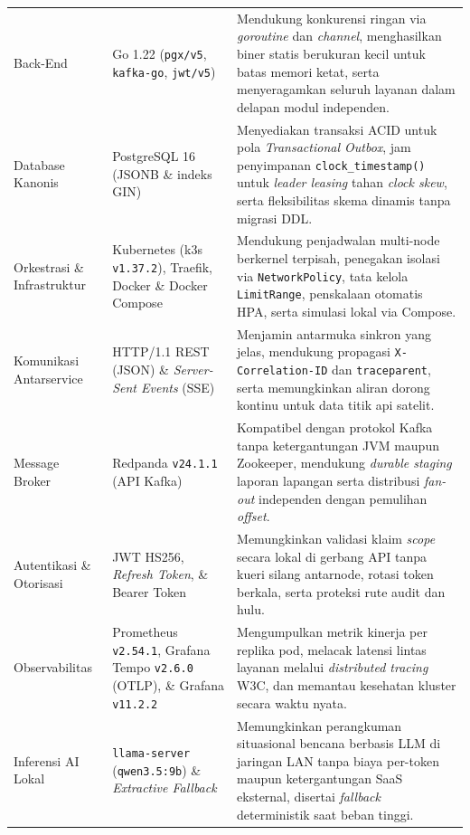 \begin{footnotesize}
\begin{spacing}{1.05}
\begin{xltabular}{\textwidth}{p{3.2cm} p{4.3cm} X}
Back-End & Go 1.22 (\texttt{pgx/v5}, \texttt{kafka-go}, \texttt{jwt/v5}) & Mendukung konkurensi ringan via \textit{goroutine} dan \textit{channel}, menghasilkan biner statis berukuran kecil untuk batas memori ketat, serta menyeragamkan seluruh layanan dalam delapan modul independen. \\
\addlinespace
Database Kanonis & PostgreSQL 16 (JSONB \& indeks GIN) & Menyediakan transaksi ACID untuk pola \textit{Transactional Outbox}, jam penyimpanan \texttt{clock\_timestamp()} untuk \textit{leader leasing} tahan \textit{clock skew}, serta fleksibilitas skema dinamis tanpa migrasi DDL. \\
\addlinespace
Orkestrasi \& Infrastruktur & Kubernetes (k3s \texttt{v1.37.2}), Traefik, Docker \& Docker Compose & Mendukung penjadwalan multi-node berkernel terpisah, penegakan isolasi via \texttt{NetworkPolicy}, tata kelola \texttt{LimitRange}, penskalaan otomatis HPA, serta simulasi lokal via Compose. \\
\addlinespace
Komunikasi Antarservice & HTTP/1.1 REST (JSON) \& \textit{Server-Sent Events} (SSE) & Menjamin antarmuka sinkron yang jelas, mendukung propagasi \texttt{X-Correlation-ID} dan \texttt{traceparent}, serta memungkinkan aliran dorong kontinu untuk data titik api satelit. \\
\addlinespace
Message Broker & Redpanda \texttt{v24.1.1} (API Kafka) & Kompatibel dengan protokol Kafka tanpa ketergantungan JVM maupun Zookeeper, mendukung \textit{durable staging} laporan lapangan serta distribusi \textit{fan-out} independen dengan pemulihan \textit{offset}. \\
\addlinespace
Autentikasi \& Otorisasi & JWT HS256, \textit{Refresh Token}, \& Bearer Token & Memungkinkan validasi klaim \textit{scope} secara lokal di gerbang API tanpa kueri silang antarnode, rotasi token berkala, serta proteksi rute audit dan hulu. \\
\addlinespace
Observabilitas & Prometheus \texttt{v2.54.1}, Grafana Tempo \texttt{v2.6.0} (OTLP), \& Grafana \texttt{v11.2.2} & Mengumpulkan metrik kinerja per replika pod, melacak latensi lintas layanan melalui \textit{distributed tracing} W3C, dan memantau kesehatan kluster secara waktu nyata. \\
\addlinespace
Inferensi AI Lokal & \texttt{llama-server} (\texttt{qwen3.5:9b}) \& \textit{Extractive Fallback} & Memungkinkan perangkuman situasional bencana berbasis LLM di jaringan LAN tanpa biaya per-token maupun ketergantungan SaaS eksternal, disertai \textit{fallback} deterministik saat beban tinggi. \\

\end{xltabular}
\end{spacing}
\end{footnotesize}
